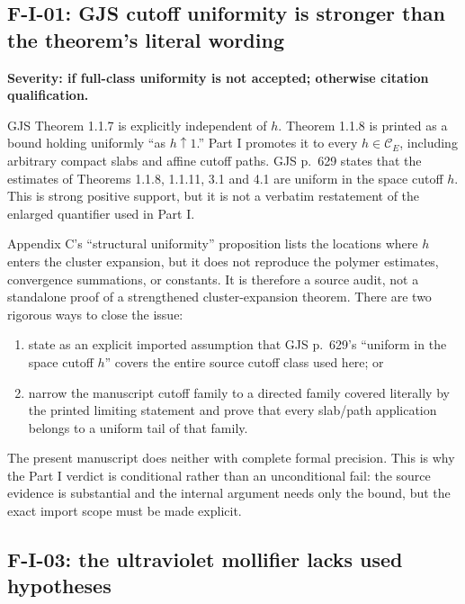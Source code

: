 \documentclass[11pt,a4paper]{article}
\begin{document}
\subsection{F-I-01: GJS cutoff uniformity is stronger than the theorem's literal wording}

\begin{finding}
\textbf{Severity: \Major if full-class uniformity is not accepted; otherwise citation
qualification.}

GJS Theorem 1.1.7 is explicitly independent of $h$.  Theorem 1.1.8 is printed as a
bound holding uniformly ``as $h\uparrow1$.''  Part I promotes it to every
$h\in\mathcal C_E$, including arbitrary compact slabs and affine cutoff paths.  GJS
p.~629 states that the estimates of Theorems 1.1.8, 1.1.11, 3.1 and 4.1 are uniform in
the space cutoff $h$.  This is strong positive support, but it is not a verbatim
restatement of the enlarged quantifier used in Part I.
\end{finding}

Appendix C's ``structural uniformity'' proposition lists the locations where $h$ enters
the cluster expansion, but it does not reproduce the polymer estimates, convergence
summations, or constants.  It is therefore a source audit, not a standalone proof of a
strengthened cluster-expansion theorem.  There are two rigorous ways to close the issue:

\begin{enumerate}
\item state as an explicit imported assumption that GJS p.~629's ``uniform in the space
cutoff $h$'' covers the entire source cutoff class used here; or
\item narrow the manuscript cutoff family to a directed family covered literally by the
printed limiting statement and prove that every slab/path application belongs to a
uniform tail of that family.
\end{enumerate}

The present manuscript does neither with complete formal precision.  This is why the
Part I verdict is conditional rather than an unconditional fail: the source evidence is
substantial and the internal argument needs only the bound, but the exact import scope
must be made explicit.

\subsection{F-I-03: the ultraviolet mollifier lacks used hypotheses}
\end{document}
